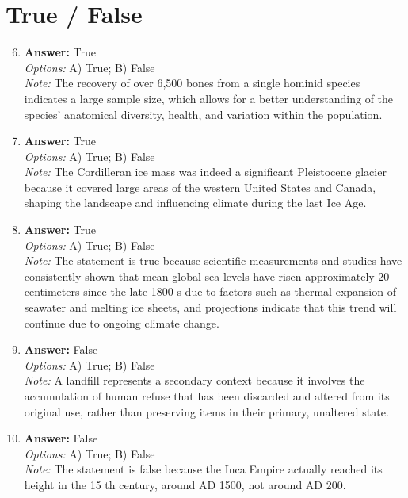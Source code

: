 \documentclass[12pt]{article}
\begin{document}
\section*{True / False}
\begin{enumerate}[label=\arabic*.]
\setcounter{enumi}{5}
\item \textbf{Answer:} True
\\ \textit{Options:} A) True; B) False
\\ \textit{Note:} The recovery of over 6,500 bones from a single hominid species indicates a large sample size, which allows for a better understanding of the species' anatomical diversity, health, and variation within the population.
\item \textbf{Answer:} True
\\ \textit{Options:} A) True; B) False
\\ \textit{Note:} The Cordilleran ice mass was indeed a significant Pleistocene glacier because it covered large areas of the western United States and Canada, shaping the landscape and influencing climate during the last Ice Age.
\item \textbf{Answer:} True
\\ \textit{Options:} A) True; B) False
\\ \textit{Note:} The statement is true because scientific measurements and studies have consistently shown that mean global sea levels have risen approximately 20 centimeters since the late 1800 s due to factors such as thermal expansion of seawater and melting ice sheets, and projections indicate that this trend will continue due to ongoing climate change.
\item \textbf{Answer:} False
\\ \textit{Options:} A) True; B) False
\\ \textit{Note:} A landfill represents a secondary context because it involves the accumulation of human refuse that has been discarded and altered from its original use, rather than preserving items in their primary, unaltered state.
\item \textbf{Answer:} False
\\ \textit{Options:} A) True; B) False
\\ \textit{Note:} The statement is false because the Inca Empire actually reached its height in the 15 th century, around AD 1500, not around AD 200.
\end{enumerate}
\end{document}
